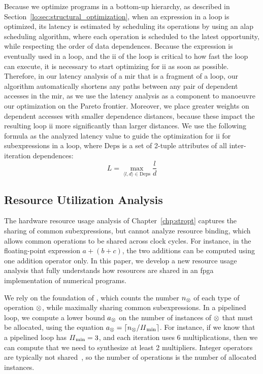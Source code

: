 Because we optimize programs in a bottom-up hierarchy, as described in
Section~\ref{lo:sec:structural_optimization}, when an expression in a loop
is optimized, its latency is estimated by scheduling its operations by using
an \gls{alap}~\cite{wang_hls} scheduling algorithm, where each operation
is scheduled to the latest opportunity, while respecting the order of data
dependences.  Because the expression is eventually used in a loop, and the
\gls{ii} of the loop is critical to how fast the loop can execute, it is
necessary to start optimizing for \gls{ii} as soon as possible. Therefore,
in our latency analysis of a \gls{mir} that is a fragment of a loop, our
algorithm automatically shortens any paths between any pair of dependent
accesses in the \gls{mir}\@, as we use the latency analysis as a component to
manoeuvre our optimization on the Pareto frontier.  Moreover, we place greater
weights on dependent accesses with smaller dependence distances, because these
impact the resulting loop \gls{ii} more significantly than larger distances.
We use the following formula as the analyzed latency value to guide the
optimization for \gls{ii} for subexpressions in a loop, where $\mathrm{Deps}$
is a set of 2-tuple attributes of all inter-iteration dependences:
\begin{equation}
    L = \max_{\langle l, d \rangle \in \mathrm{Deps}} \frac{l}{d}
\end{equation}

\subsection{Resource Utilization Analysis}
\label{lo:sub:resource_utilization_analysis}

The hardware resource usage analysis of Chapter~\ref{chp:stropt} captures the
sharing of common subexpressions, but cannot analyze resource binding, which
allows common operations to be shared across clock cycles. For instance, in
the floating-point expression $a + (b + c)$, the two additions can be computed
using one addition operator only. In this paper, we develop a new resource
usage analysis that fully understands how resources are shared in an \gls{fpga}
implementation of numerical programs.

We rely on the foundation of \soap{}, which counts the number $n_\otimes$
of each type of operation $\otimes$, while maximally sharing common
subexpressions.  In a pipelined loop, we compute a lower bound $a_\otimes$
on the number of instances of $\otimes$ that must be allocated, using
the equation $a_\otimes = \lceil n_\otimes/\mathit{II}_{\rm min}\rceil$.  For instance,
if we know that a pipelined loop has $\mathit{II}_{\rm min} = 3$, and each iteration uses 6
multiplications, then we can compute that we need to synthesize at least 2
multipliers.  Integer operators are typically not shared~\cite{cong15}, so the
number of operations is the number of allocated instances.

